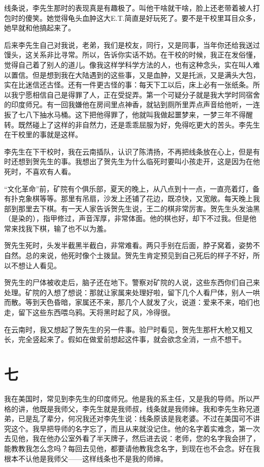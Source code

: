 线条说，李先生那时的表现真是有趣极了。叫他干啥就干啥，脸上还老带着被人打包时的傻笑。她觉得龟头血肿这大E.T.简直是好玩死了。要不是干校里耳目众多，她早就和他搞起来了。 


后来李先生自己对我说，老弟，我们是校友，同行，又是同事，当年你还给我送过馒头，这关系非比寻常。所以，告诉你实话不妨。在干校的时候，我正在发俗懂，觉得自己着了别人的道儿。像我这样学科学方法的人，也有这种念头，实在叫人难以置信。但是想到我在大陆遇到的这些事，又是血肿，又是托派，又是满头大包，实在比迷信还古怪。还有一件更古怪的事：每天下工以后，床上必有一张纸条。所以我宁愿相信自己是得罪了人，正在受捉弄。第一个可疑分子就是我大学时同宿舍的印度师兄。有一回我嫌他在房间里点神香，就钻到厕所里弄点声音给他听，一连扳了七八下抽水马桶。这下把他得罪了，他就叫我做起噩梦来，一梦三年不得醒转。既然碰上了这样的非自然力，还是乖乖屈服为好，免得吃更大的苦头。李先生在干校里的事就是这样。 

李先生在下干校时，我在云南插队，认识了陈清扬，不再把线条放在心上，但是有时还想到贺先生的事。我想出了贺先生为什么临死时要叫小孩走开，这是因为在他死时，不喜欢有人看。 

“文化革命”前，矿院有个俱乐部，夏天的晚上，从八点到十一点，一直亮着灯，备有扑克象棋等等。那里有吊扇，沙发上还铺了花边，既凉快，又宽敞。每天晚上我部到那里去下棋。有一天人家告诉贺先生说，王二的棋非常厉害。贺先生头发油黑（是染的），指甲修过，声音浑厚，非常体面。他的棋也好，却下不过我。但是他常来找我下棋，输了也不以为羞。 

贺先生死时，头发半截黑半截白，非常难看。两只手别在后面，脖子窝着，姿势不自然。总的来说，他死时像个土拨鼠。贺先生肯定预见到自己死后的样子不好，所以不想让人看见。 

贺先生的尸体被收走后，脑子还在地下。警察对矿院的人说，这些东西你们自己来处理。矿院的入想了想说：那就让家属来处理好啦，留下几个人看尸体，别人一哄而散。等到天色昏暗，家属还不来，那几个人就发了火，说道：爱来不来，咱们也走，留下这些东西喂乌鸦。天将黑时起了风，冷得很。 

在云南时，我又想起了贺先生的另一件事。验尸时看见，贺先生那杆大枪又粗又长，完全竖起来了。假如在做爱前想起这件事，就会欲念全消，一点不想干。

\section{七}

我在美国时，常见到李先生的印度师兄。他是我的系主任，又是我的导师。所以严格的讲，他既是我师父，李先生就是我师叔，线条就是我师婶。我和李先生称兄道弟，已是乱了辈分，何况我还对李先生说：线条原该是我老婆。不过在美国可不讲究这个。我早把导师的名字忘了，而且从来就没记住。他的名字着实难念，第一次去见他，我在他办公室外看了半天牌子，然后进去说：老师，您的名字我会拼了，能教教我怎么念吗？每回去见他，都要请他教我念名字，到现在也不会念。好在我根本不认他是我师父——这样线条也不是我的师婶。 

